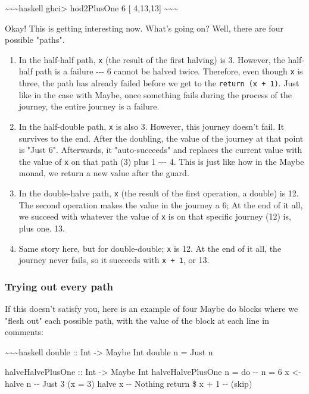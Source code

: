 \documentclass[]{article}
\begin{document}
\textasciitilde{}\textasciitilde{}\textasciitilde{}haskell ghci\textgreater{}
hod2PlusOne 6 {[} 4,13,13{]} \textasciitilde{}\textasciitilde{}\textasciitilde{}

Okay! This is getting interesting now. What's going on? Well, there are four
possible "paths".

\begin{enumerate}
\tightlist
\item
  In the half-half path, \texttt{x} (the result of the first halving) is 3.
  However, the half-half path is a failure -\/-\/- 6 cannot be halved twice.
  Therefore, even though \texttt{x} is three, the path has already failed before
  we get to the \texttt{return\ (x\ +\ 1)}. Just like in the case with Maybe,
  once something fails during the process of the journey, the entire journey is
  a failure.
\item
  In the half-double path, \texttt{x} is also 3. However, this journey doesn't
  fail. It survives to the end. After the doubling, the value of the journey at
  that point is "Just 6". Afterwards, it "auto-succeeds" and replaces the
  current value with the value of \texttt{x} on that path (3) plus 1 -\/-\/- 4.
  This is just like how in the Maybe monad, we return a new value after the
  guard.
\item
  In the double-halve path, \texttt{x} (the result of the first operation, a
  double) is 12. The second operation makes the value in the journey a 6; At the
  end of it all, we succeed with whatever the value of \texttt{x} is on that
  specific journey (12) is, plus one. 13.
\item
  Same story here, but for double-double; \texttt{x} is 12. At the end of it
  all, the journey never fails, so it succeeds with \texttt{x\ +\ 1}, or 13.
\end{enumerate}

\subsubsection{Trying out every path}

If this doesn't satisfy you, here is an example of four Maybe do blocks where we
"flesh out" each possible path, with the value of the block at each line in
comments:

\textasciitilde{}\textasciitilde{}\textasciitilde{}haskell double :: Int
-\textgreater{} Maybe Int double n = Just n

halveHalvePlusOne :: Int -\textgreater{} Maybe Int halveHalvePlusOne n = do -\/-
n = 6 x \textless{}- halve n -\/- Just 3 (x = 3) halve x -\/- Nothing return \$
x + 1 -\/- (skip)
\end{document}

